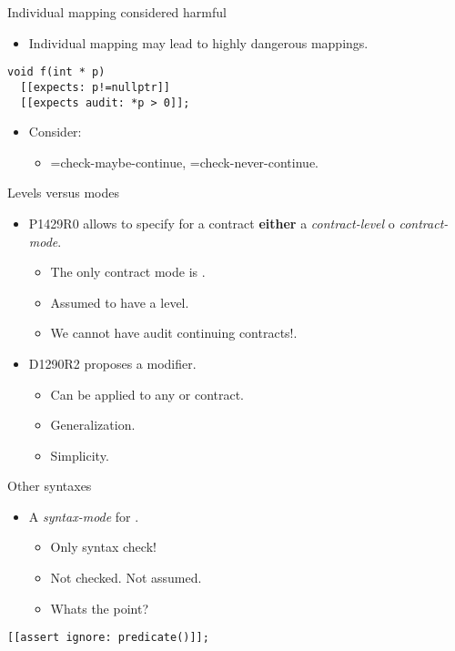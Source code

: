 \begin{frame}[t,fragile]{Individual mapping considered harmful}
\begin{itemize}
  \item Individual mapping may lead to highly dangerous mappings.
\end{itemize}
\begin{lstlisting}
void f(int * p)
  [[expects: p!=nullptr]]
  [[expects audit: *p > 0]];
\end{lstlisting}
\begin{itemize}
  \item Consider:
    \begin{itemize}
      \item {}=check-maybe-continue, =check-never-continue.
    \end{itemize}
\end{itemize}
\end{frame}

\begin{frame}[t]{Levels versus modes}
\begin{itemize}
  \item P1429R0 allows to specify for a contract \textbf{either} a
	  \emph{contract-level} o \emph{contract-mode}.
    \begin{itemize}
      \item The only contract mode is .
      \item Assumed to have a  level.
      \item \alert{We cannot have audit continuing contracts!}.	      
    \end{itemize}

  \vfill
  \item D1290R2 proposes a  modifier.
    \begin{itemize}
      \item Can be applied to any  or  contract.
      \item Generalization.
      \item Simplicity.
    \end{itemize}
\end{itemize}
\end{frame}

\begin{frame}[t,fragile]{Other syntaxes}
\begin{itemize}
  \item A \emph{syntax-mode} for .
    \begin{itemize}
      \item Only syntax check!
      \item Not checked. Not assumed.
      \item Whats the point?
    \end{itemize}
\end{itemize}
\begin{lstlisting}
[[assert ignore: predicate()]];
\end{lstlisting}
\end{frame}


